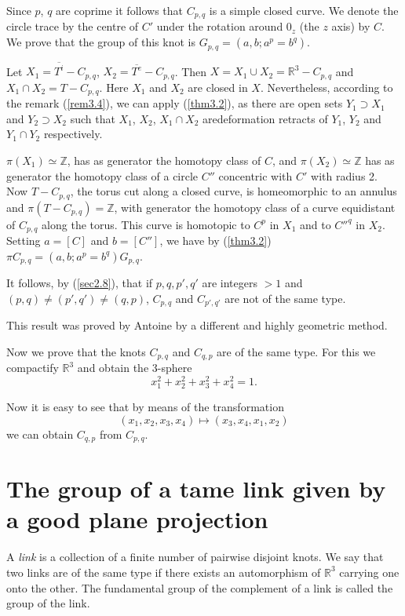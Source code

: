 Since $p$, $q$ are coprime it follows that $C_{p,q}$ is a simple
closed curve. We denote the circle trace by the centre of $C'$ under
the rotation around $0_z$ (the $z$ axis) by $C$. We prove that the
group of this knot is $G_{p, q} = (a, b ; a^p = b^q)$. 

Let $X_1 = \overline{T^i} - C_{p,q}$, $X_2 = \overline{T^e} -
C_{p,q}$. Then $X = 
X_1 \cup X_2 = \mathbb{R}^3 - C_{p,q}$ and $X_1 \cap X_2 = T- C_{p,q}$. Here
$X_1$ and $X_2$ are closed in $X$. Nevertheless, according to the
remark (\ref{rem3.4}), we can apply (\ref{thm3.2}), as there are open sets $Y_1
\supset X_1$ and $Y_2 \supset X_2$ such that $X_1$, $X_2$, $X_1 \cap
X_2$ are\pageoriginale deformation retracts of $Y_1$, $Y_2$ and $Y_1
\cap Y_2$ respectively.  

$\pi (X_1) \simeq \mathbb{Z}$, has as generator the homotopy class
of $C$, and $\pi (X_2) \simeq \mathbb{Z}$ has as generator the
homotopy class of a circle $C''$ concentric with $C'$ with radius
2. Now $T- C_{p,q}$, the torus cut along a closed curve, is
homeomorphic to an annulus and $\pi (T- C_{p,q})= \mathbb{Z}$, with
generator the homotopy class of a curve equidistant of $C_{p,q}$ along
the torus. This curve is homotopic to $C^p$ in $X_1$ and to $C''^q$
in $X_2$. Setting $a = [C]$ and $b= [C'']$, we have by (\ref{thm3.2}) $\pi
C_{p,q} = (a, b; a^p = b^q) G_{p,q}$. 

It follows, by (\ref{sec2.8}), that if $p, q, p', q'$ are integers $>1$
and $(p, q) \neq (p', q') \neq (q, p)$, $C_{p,q}$ and $C_{p',q'}$ are
not of the same type. 

This result was proved by Antoine by a different and highly geometric 
method. 

Now we prove that the knots $C_{p,q}$ and $C_{q,p}$ are of the same
type. For this we compactify $\mathbb{R}^3$ and obtain the 3-sphere 
$$
x^2_1+ x^2_2 + x^2_3 + x^2_4 = 1. 
$$

Now it is easy to see that by means of the transformation 
$$
(x_1, x_2, x_3, x_4) \mapsto (x_3, x_4, x_1, x_2) 
$$
we can obtain $C_{q,p}$ from $C_{p,q}$.


\section{The group of a tame link given by a good plane
  projection}\pageoriginale %

A \textit{link} is a collection of a finite number of pairwise
disjoint knots. We say that two links are of the same type if there
exists an automorphism of $\mathbb{R}^3$ carrying one onto the
other. The fundamental group of the complement of a link is called the
group of the link. 

